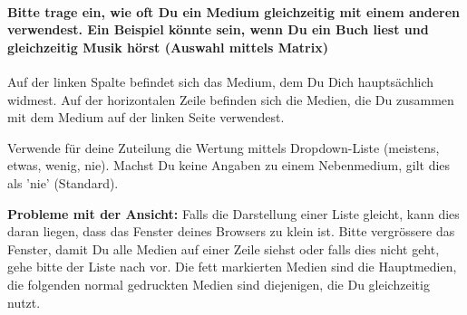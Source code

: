 \paragraph{Bitte trage ein, wie oft Du ein Medium gleichzeitig mit einem anderen verwendest. Ein Beispiel könnte sein, wenn Du ein Buch liest und gleichzeitig Musik hörst (Auswahl mittels Matrix)}
Auf der linken Spalte befindet sich das Medium, dem Du Dich hauptsächlich widmest. Auf der horizontalen Zeile befinden sich die Medien, die Du zusammen mit dem Medium auf der linken Seite verwendest.\par
Verwende für deine Zuteilung die Wertung mittels Dropdown-Liste (meistens, etwas, wenig, nie). Machst Du keine Angaben zu einem Nebenmedium, gilt dies als 'nie' (Standard).\par
\textbf{Probleme mit der Ansicht:} Falls die Darstellung einer Liste gleicht, kann dies daran liegen, dass das Fenster deines Browsers zu klein ist. Bitte vergrössere das Fenster, damit Du alle Medien auf einer Zeile siehst oder falls dies nicht geht, gehe bitte der Liste nach vor. Die fett markierten Medien sind die Hauptmedien, die folgenden normal gedruckten Medien sind diejenigen, die Du gleichzeitig nutzt.\par
